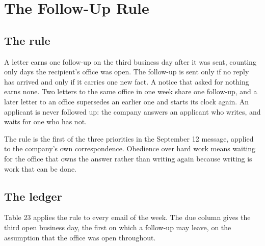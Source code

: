 \section{The Follow-Up Rule}

\subsection{The rule}

A letter earns one follow-up on the third business day after it was sent,
counting only days the recipient's office was open. The follow-up is sent only
if no reply has arrived and only if it carries one new fact. A notice that asked
for nothing earns none. Two letters to the same office in one week share one
follow-up, and a later letter to an office supersedes an earlier one and starts
its clock again. An applicant is never followed up: the company answers an
applicant who writes, and waits for one who has not.

The rule is the first of the three priorities in the September 12 message,
applied to the company's own correspondence. Obedience over hard work means
waiting for the office that owns the answer rather than writing again because
writing is work that can be done.

\subsection{The ledger}

Table 23 applies the rule to every email of the week. The due column gives the
third open business day, the first on which a follow-up may leave, on the
assumption that the office was open throughout.


